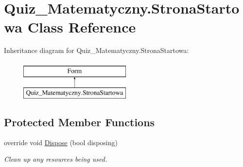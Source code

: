 \hypertarget{class_quiz___matematyczny_1_1_strona_startowa}{}\section{Quiz\+\_\+\+Matematyczny.\+Strona\+Startowa Class Reference}
\label{class_quiz___matematyczny_1_1_strona_startowa}
Inheritance diagram for Quiz\+\_\+\+Matematyczny.\+Strona\+Startowa\+:\begin{figure}[H]
\begin{center}
\leavevmode
\includegraphics[height=2.000000cm]{class_quiz___matematyczny_1_1_strona_startowa}
\end{center}
\end{figure}
\subsection*{Protected Member Functions}
\begin{DoxyCompactItemize}
\item 
override void \mbox{\hyperlink{class_quiz___matematyczny_1_1_strona_startowa_a22ff6f051d145644baad291ae08735d9}{Dispose}} (bool disposing)
\begin{DoxyCompactList}\small\item\em Clean up any resources being used. \end{DoxyCompactList}\end{DoxyCompactItemize}
